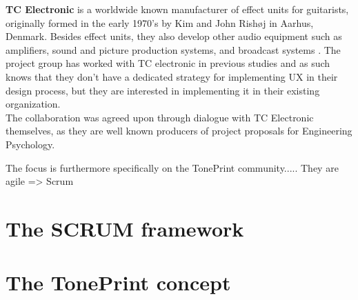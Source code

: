 \noindent
\textbf{TC Electronic} is a worldwide known manufacturer of effect units for guitarists, originally formed in the early 1970's by Kim and John Rishøj in Aarhus, Denmark. Besides effect units, they also develop other audio equipment such as amplifiers, sound and picture production systems, and broadcast systems \parencite{WEB:TCElectronic}. The project group has worked with TC electronic in previous studies and as such knows that they don't have a dedicated strategy for implementing UX in their design process, but they are interested in implementing it in their existing organization.\\

\noindent
The collaboration was agreed upon through dialogue with TC Electronic themselves, as they are well known producers of project proposals for Engineering Psychology. 

The focus is furthermore specifically on the TonePrint community.....
They are agile => Scrum

\section{The SCRUM framework}
\label{scrum}


\section{The TonePrint concept}
\label{TonePrintConceptDefined}







